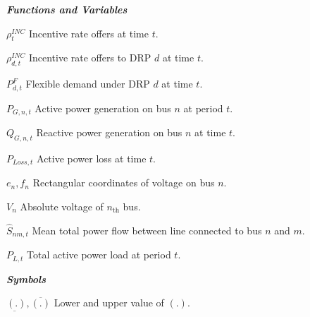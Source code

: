 \documentclass[journal]{IEEEtran}
\begin{document}
\begin{IEEEdescription}[\IEEEusemathlabelsep\IEEEsetlabelwidth{~~~~~~~~~~~~~}]
		\item[\textit{\textbf{Functions and Variables}}]
		\item[$\rho _{t}^{INC}$] Incentive rate offers at time $t$.
      \item[$\rho _{d,t}^{INC}$] Incentive rate offers to DRP $d$ at time $t$.
      \item[$P_{d,t}^F$] Flexible demand under DRP $d$ at time $t$.
      \item[${P_{G,n,t}}$]  Active power generation  on bus $n$ at period $t$.
       \item[${Q_{G,n,t}}$] Reactive power generation on bus $n$ at time $t$.
       	\item[$P_{Loss,t}$] Active power loss at time $t$.
      \item[${e_n},{f_n}$] Rectangular coordinates of voltage on bus $n$.
      \item[${V_n}$] Absolute voltage of $n_\text{th}$ bus.
      \item[${\widehat S_{nm,t}}$] Mean total power flow between line connected to bus $n$ and $m$.
      \item[${P_{L,t}}$]  Total active power load at period $t$.
    	\item[\textit{\textbf{Symbols}}]
    \item[ $\underbar{(.)}, \overline{( . )}$ ]  Lower and upper value of $(.)$.
\end{IEEEdescription}





\vspace{-1mm}
\end{document}
